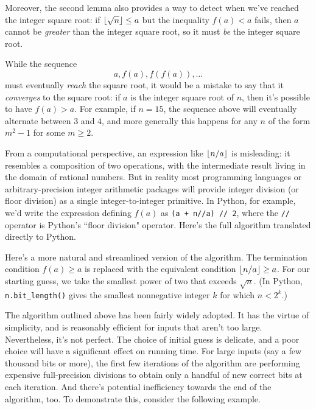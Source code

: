 \documentclass[a4paper]{article}
\DeclarePairedDelimiter\floor{\lfloor}{\rfloor}
\theoremstyle{plain}
\theoremstyle{definition}
\begin{document}
Moreover, the second lemma also provides a way to detect when we've reached the
integer square root: if $\floor{\sqrt n} \le a$ but the inequality $f(a) < a$
fails, then $a$ cannot be \emph{greater} than the integer square root, so it
must \emph{be} the integer square root.

While the sequence
$$a, f(a), f(f(a)), \dots$$ must eventually \emph{reach} the square root, it
would be a mistake to say that it \emph{converges} to the square root: if $a$
is the integer square root of $n$, then it's possible to have $f(a) > a$. For
example, if $n=15$, the sequence above will eventually alternate between $3$
and $4$, and more generally this happens for any $n$ of the form $m^2 - 1$
for some $m \ge 2$.

From a computational perspective, an expression like $\floor{n / a}$
is misleading: it resembles a composition of two operations, with the
intermediate result living in the domain of rational numbers. But in reality
most programming languages or arbitrary-precision integer arithmetic packages
will provide integer division (or floor division) as a single
integer-to-integer primitive. In Python, for example, we'd write the expression
defining $f(a)$ as \lstinline$(a + n//a) // 2$, where the \lstinline$//$ operator
is Python's ``floor division" operator. Here's the full algorithm translated directly
to Python.



Here's a more natural and streamlined version of the algorithm. The termination
condition $f(a) \ge a$ is replaced with the equivalent condition $\floor{n/a}
\ge a$. For our starting guess, we take the smallest power of two that exceeds
$\sqrt n$.  (In Python, \lstinline$n.bit_length()$ gives the smallest
nonnegative integer $k$ for which $n < 2^k$.)



The algorithm outlined above has been fairly widely adopted. It has the virtue
of simplicity, and is reasonably efficient for inputs that aren't too large.
Nevertheless, it's not perfect. The choice of initial guess is delicate, and a
poor choice will have a significant effect on running time. For large inputs
(say a few thousand bits or more), the first few iterations of the algorithm
are performing expensive full-precision divisions to obtain only a handful of
new correct bits at each iteration. And there's potential inefficiency towards
the end of the algorithm, too. To demonstrate this, consider the following
example.
\end{document}
